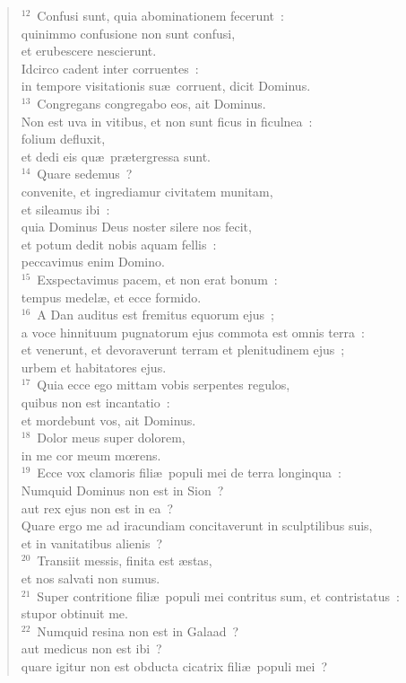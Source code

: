 \begin{flushleft}
\begin{verse}
${}^{12}$~Confusi sunt, quia abominationem fecerunt~:\\ quinimmo confusione non sunt confusi,\\ et erubescere nescierunt.\\ Idcirco cadent inter corruentes~:\\ in tempore visitationis su\ae\ corruent, dicit Dominus.\\
${}^{13}$~Congregans congregabo eos, ait Dominus.\\ Non est uva in vitibus, et non sunt ficus in ficulnea~:\\ folium defluxit,\\ et dedi eis qu\ae\ pr\ae tergressa sunt.\\
${}^{14}$~Quare sedemus~?\\ convenite, et ingrediamur civitatem munitam,\\ et sileamus ibi~:\\ quia Dominus Deus noster silere nos fecit,\\ et potum dedit nobis aquam fellis~:\\ peccavimus enim Domino.\\
${}^{15}$~Exspectavimus pacem, et non erat bonum~:\\ tempus medel\ae , et ecce formido.\\
${}^{16}$~A Dan auditus est fremitus equorum ejus~;\\ a voce hinnituum pugnatorum ejus commota est omnis terra~:\\ et venerunt, et devoraverunt terram et plenitudinem ejus~;\\ urbem et habitatores ejus.\\
${}^{17}$~Quia ecce ego mittam vobis serpentes regulos,\\ quibus non est incantatio~:\\ et mordebunt vos, ait Dominus.\\
${}^{18}$~Dolor meus super dolorem,\\ in me cor meum mœrens.\\
${}^{19}$~Ecce vox clamoris fili\ae\ populi mei de terra longinqua~:\\ Numquid Dominus non est in Sion~?\\ aut rex ejus non est in ea~?\\ Quare ergo me ad iracundiam concitaverunt in sculptilibus suis,\\ et in vanitatibus alienis~?\\
${}^{20}$~Transiit messis, finita est \ae stas,\\ et nos salvati non sumus.\\
${}^{21}$~Super contritione fili\ae\ populi mei contritus sum, et contristatus~:\\ stupor obtinuit me.\\
${}^{22}$~Numquid resina non est in Galaad~?\\ aut medicus non est ibi~?\\ quare igitur non est obducta cicatrix fili\ae\ populi mei~?\end{verse}\end{flushleft}


